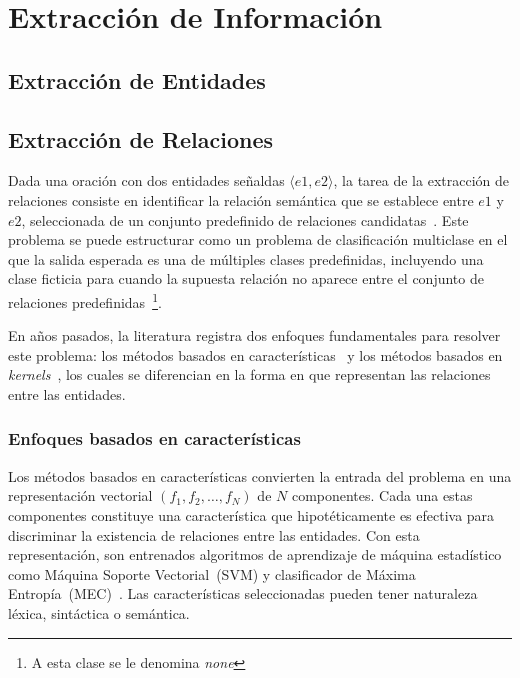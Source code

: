 \chapter{Extracción de Información}\label{chapter:information_extraction}

\section{Extracción de Entidades}

\section{Extracción de Relaciones}

Dada una oración con dos entidades señaldas $\langle e1,e2 \rangle$, la tarea de la extracción de relaciones consiste en identificar la relación semántica que se establece entre $e1$ y $e2$, seleccionada de un conjunto predefinido de relaciones candidatas~\cite{hendrickx2009semeval}.
Este problema se puede estructurar como un problema de clasificación multiclase en el que la salida esperada es una de múltiples clases predefinidas, incluyendo una clase ficticia para cuando la supuesta relación no aparece entre el conjunto de relaciones predefinidas~\footnote{A esta clase se le denomina \textit{none}}.

En años pasados, la literatura registra dos enfoques fundamentales para resolver este problema: los métodos basados en características~\cite{kambhatla2004combining, boschee2005automatic, guodong2005exploring, grishman2005nyu, jiang2007systematic, chan2010exploiting, rink2010utd, sun2011semi, rink2010utd, nguyen2014employing} y los métodos basados en \textit{kernels}~\cite{zelenko2003kernel, culotta2004dependency, bunescu2005shortest, qian2008exploiting, nguyen2009convolution, sun2014feature}, los cuales se diferencian en la forma en que representan las relaciones entre las entidades.

\subsection{Enfoques basados en características}

Los métodos basados en características convierten la entrada del problema en una representación vectorial $(f_1,f_2,\dots,f_N)$ de $N$ componentes.
Cada una estas componentes constituye una característica que hipotéticamente es efectiva para discriminar la existencia de relaciones entre las entidades.
Con esta representación, son entrenados algoritmos de aprendizaje de máquina estadístico como Máquina Soporte Vectorial~(SVM)\cite{cortes1995support} y clasificador de Máxima Entropía~(MEC)~\cite{maxentropy}.
Las características seleccionadas pueden tener naturaleza léxica, sintáctica o semántica.

